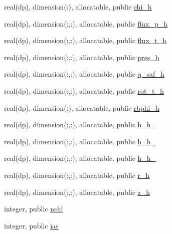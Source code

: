\begin{DoxyCompactItemize}
\item 
real(dp), dimension(\+:), allocatable, public \hyperlink{namespacehelena__vars_aaaa83af362a93836b4dc74bdfa715d1a}{chi\+\_\+h}
\item 
real(dp), dimension(\+:,\+:), allocatable, public \hyperlink{namespacehelena__vars_ab84791cf288fa3209eafb797479d1e47}{flux\+\_\+p\+\_\+h}
\item 
real(dp), dimension(\+:,\+:), allocatable, public \hyperlink{namespacehelena__vars_af28db18d415da215cae4d9ec9f60e18b}{flux\+\_\+t\+\_\+h}
\item 
real(dp), dimension(\+:,\+:), allocatable, public \hyperlink{namespacehelena__vars_a3c258f679dc87684823f378abdc851f0}{pres\+\_\+h}
\item 
real(dp), dimension(\+:,\+:), allocatable, public \hyperlink{namespacehelena__vars_a95906460e4a767f4dd020100b93a631c}{q\+\_\+saf\+\_\+h}
\item 
real(dp), dimension(\+:,\+:), allocatable, public \hyperlink{namespacehelena__vars_ae54b26f364e5cc4da39bbb01807e0da1}{rot\+\_\+t\+\_\+h}
\item 
real(dp), dimension(\+:), allocatable, public \hyperlink{namespacehelena__vars_aff62b635308558649bf727ac93fb7fea}{rbphi\+\_\+h}
\item 
real(dp), dimension(\+:,\+:), allocatable, public \hyperlink{namespacehelena__vars_acb51f1141d5faeeef88bbf7fc6bab55f}{h\+\_\+h\+\_}
\item 
real(dp), dimension(\+:,\+:), allocatable, public \hyperlink{namespacehelena__vars_ab3fee13ba0983e009a160324044cb708}{h\+\_\+h\+\_}
\item 
real(dp), dimension(\+:,\+:), allocatable, public \hyperlink{namespacehelena__vars_a1456485c35bfb60ed2d7f93d611a7b5d}{h\+\_\+h\+\_}
\item 
real(dp), dimension(\+:,\+:), allocatable, public \hyperlink{namespacehelena__vars_a0d157eace0479c9b8cbd4de9495f9775}{r\+\_\+h}
\item 
real(dp), dimension(\+:,\+:), allocatable, public \hyperlink{namespacehelena__vars_a41e897edb2a8b34fa7bde28ff57d012a}{z\+\_\+h}
\item 
integer, public \hyperlink{namespacehelena__vars_a0489f36c6549c35a745ec6d540940d93}{nchi}
\item 
integer, public \hyperlink{namespacehelena__vars_a009c168bb16124399a6059f7a6107a56}{ias}
\end{DoxyCompactItemize}


